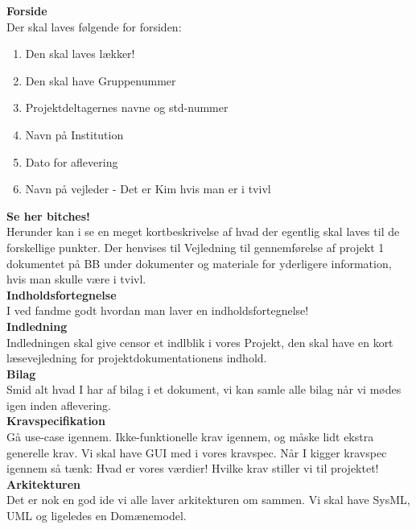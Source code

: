 \documentclass[11pt]{article}
\begin{document}
\textbf{Forside}\\

Der skal laves følgende for forsiden:
\begin{enumerate}
	\item Den skal laves lækker! \checkmark
	\item Den skal have Gruppenummer \checkmark
	\item Projektdeltagernes navne og std-nummer \checkmark
	\item Navn på Institution \checkmark
	\item Dato for aflevering \checkmark
	\item Navn på vejleder - Det er Kim hvis man er i tvivl \checkmark
\end{enumerate}

\textbf{Se her bitches!}\\
\text Herunder kan i se en meget kortbeskrivelse af hvad der egentlig skal laves til de forskellige punkter. Der henvises til Vejledning til gennemførelse af projekt 1 dokumentet på BB under dokumenter og materiale for yderligere information, hvis man skulle være i tvivl.\\

\textbf{Indholdsfortegnelse}
\\
I ved fandme godt hvordan man laver en indholdsfortegnelse!
\\

\textbf{Indledning}
\\
Indledningen skal give censor et indlblik i vores Projekt, den skal have en kort læsevejledning for projektdokumentationens indhold. \\

\textbf{Bilag}\\
Smid alt hvad I har af bilag i et dokument, vi kan samle alle bilag når vi mødes igen inden aflevering.\\

\textbf{Kravspecifikation}\\
Gå use-case igennem. Ikke-funktionelle krav igennem, og måske lidt ekstra generelle krav. Vi skal have GUI med i vores kravspec. Når I kigger kravspec igennem så tænk: Hvad er vores værdier! Hvilke krav stiller vi til projektet!\\

\textbf{Arkitekturen}\\
Det er nok en god ide vi alle laver arkitekturen om sammen. Vi skal have SysML, UML og ligeledes en Domænemodel.\\
\end{document}

